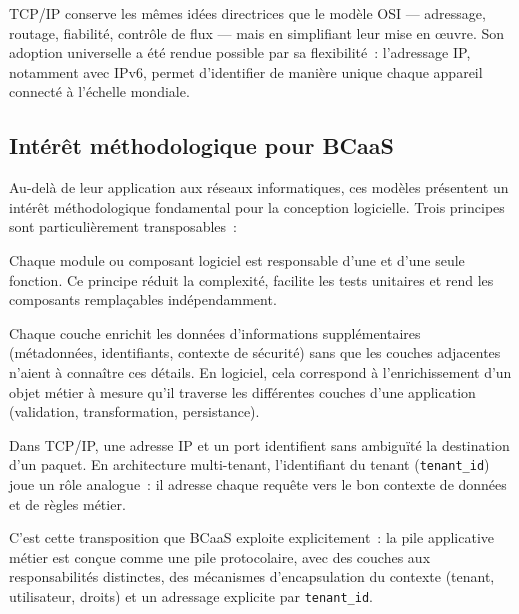 TCP/IP conserve les mêmes idées directrices que le modèle OSI — adressage, routage,
fiabilité, contrôle de flux — mais en simplifiant leur mise en œuvre. Son adoption
universelle a été rendue possible par sa flexibilité~: l'adressage IP, notamment avec
IPv6, permet d'identifier de manière unique chaque appareil connecté à l'échelle mondiale.

\subsection{Intérêt méthodologique pour BCaaS}
\label{subsec:osi-bcaas}

Au-delà de leur application aux réseaux informatiques, ces modèles présentent un intérêt
méthodologique fondamental pour la conception logicielle. Trois principes sont
particulièrement transposables~:

\begin{description}[leftmargin=0.5cm]
  \item[\textbf{Séparation des préoccupations par couches} (\textit{Separation of
    Concerns})]
    Chaque module ou composant logiciel est responsable d'une et d'une seule fonction. Ce
    principe réduit la complexité, facilite les tests unitaires et rend les composants
    remplaçables indépendamment.

  \item[\textbf{Encapsulation progressive du contexte}]
    Chaque couche enrichit les données d'informations supplémentaires (métadonnées,
    identifiants, contexte de sécurité) sans que les couches adjacentes n'aient à
    connaître ces détails. En logiciel, cela correspond à l'enrichissement d'un objet
    métier à mesure qu'il traverse les différentes couches d'une application (validation,
    transformation, persistance).

  \item[\textbf{Adressage explicite des destinataires}]
    Dans TCP/IP, une adresse IP et un port identifient sans ambiguïté la destination d'un
    paquet. En architecture multi-tenant, l'identifiant du tenant (\texttt{tenant\_id})
    joue un rôle analogue~: il adresse chaque requête vers le bon contexte de données et
    de règles métier.
\end{description}

C'est cette transposition que BCaaS exploite explicitement~: la pile applicative métier
est conçue comme une pile protocolaire, avec des couches aux responsabilités distinctes,
des mécanismes d'encapsulation du contexte (tenant, utilisateur, droits) et un adressage
explicite par \texttt{tenant\_id}.

